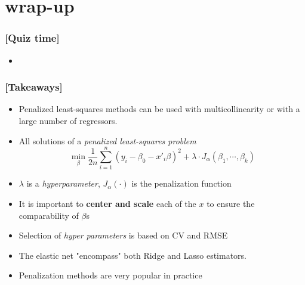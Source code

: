 \documentclass[xcolor=x11names,compress]{beamer}
\renewcommand{\(}{\begin{columns}}
\renewcommand{\)}{\end{columns}}
\newcommand{\<}[1]{\begin{column}{#1}}
\renewcommand{\>}{\end{column}}
\begin{document}
\section{wrap-up}

\begin{frame} %
\frametitle{\textcolor{brique}{[Quiz time]}}
\pause
\begin{itemize}[<+->]
  \item[]
 \end{itemize}
\end{frame}



\begin{frame} %
\frametitle{\textcolor{brique}{[Takeaways]}}
\begin{itemize}[<+->]
\item Penalized least-squares methods can be used with multicollinearity or with a large number of regressors.
\item All solutions of a \textit{penalized least-squares problem}$$
\min_{\beta} \frac{1}{2n}
     \sum_{i=1}^{n}{ \left( y_i - \beta_0 - x'_i\beta\right)^{2} } +
\lambda \cdot J_{\alpha}(\beta_1, \cdots, \beta_k)
$$
\item[] $\lambda$ is a \textit{hyperparameter}, $J_{\alpha}(\cdot)$ is the penalization function
\item It is important to \textbf{center and scale}  each of the $x$ to ensure the comparability of $\beta$s
\item  Selection of \textit{hyper parameters} is based on CV and RMSE
\item The elastic net "encompass" both Ridge and Lasso estimators.
\item Penalization methods are very popular in practice
\end{itemize}
\end{frame}
\end{document}
